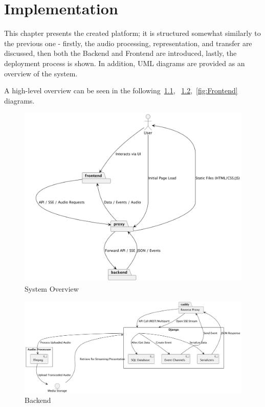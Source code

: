 \chapter{Implementation}\label{ch:implementation}

This chapter presents the created platform; it is structured somewhat similarly to the previous one - firstly, the
audio processing, representation, and transfer are discussed, then both the Backend and Frontend are introduced,
lastly, the deployment process is shown.
In addition, UML diagrams are provided as an overview of the system.

A high-level overview can be seen in the following~\ref{fig:system_overview},
~\ref{fig:Backend},~\ref{fig:Frontend} diagrams.

\begin{figure}[htbp]
    \centering
    \includegraphics[width=1\textwidth, keepaspectratio]{diagrams/system.png}
    \caption{System Overview}
    \label{fig:system_overview}
\end{figure}

\begin{figure}[htbp]
    \centering
    \includegraphics[width=1\textwidth, keepaspectratio]{diagrams/backend.png}
    \caption{Backend}
    \label{fig:Backend}
\end{figure}

